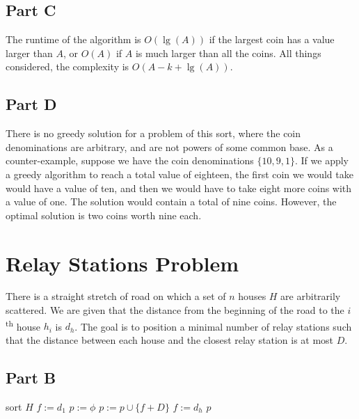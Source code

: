 \documentclass{article}
\begin{document}
\subsection*{Part C}

The runtime of the algorithm is \(O(\lg(A))\) if the largest coin has a value larger than \(A\), or \(O(A)\) if \(A\) is much larger than all the coins. All things considered, the complexity is \(O(A-k+\lg(A))\).

\subsection*{Part D}

There is no greedy solution for a problem of this sort, where the coin denominations are arbitrary, and are not powers of some common base. As a counter-example, suppose we have the coin denominations \(\{10, 9, 1\}\). If we apply a greedy algorithm to reach a total value of eighteen, the first coin we would take would have a value of ten, and then we would have to take eight more coins with a value of one. The solution would contain a total of nine coins. However, the optimal solution is two coins worth nine each.

\section{Relay Stations Problem}

There is a straight stretch of road on which a set of \(n\) houses \(H\) are arbitrarily scattered. We are given that the distance from the beginning of the road to the \(i\)\textsuperscript{th} house \(h_i\) is \(d_h\). The goal is to position a minimal number of relay stations such that the distance between each house and the closest relay station is at most \(D\).

\subsection*{Part B}

\begin{algorithmic}
	\begin{algorithm}
		\State sort \(H\)
		\State \(f := d_1\)
		\State \(p := \phi\)
		\State \(p := p \cup \{f + D\}\)
		\State \(f := d_h\)
		\EndIf
		\EndFor
		\Return \(p\)
		\EndFunction
	\end{algorithm}
\end{algorithmic}
\end{document}
